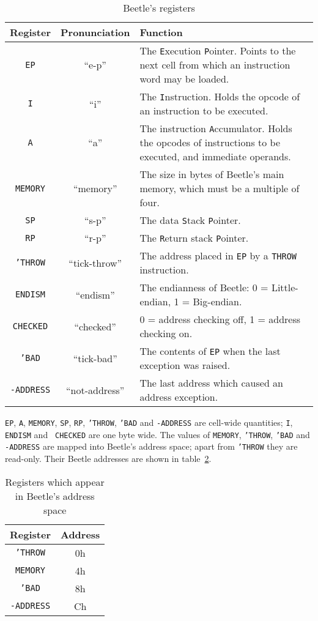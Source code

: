 \documentclass[english]{article}
\newlength{\opcode}\opcode=0.5in
\begin{document}
\begin{table}[htbp]
\begin{center}
\begin{tabular}{ccp{3.75in}} \toprule
\bf Register & \bf Pronunciation & \bf Function \\
    \midrule
{\tt EP} & ``e-p'' & The {\tt E}xecution {\tt P}ointer. Points to the next
    cell from which an instruction word may be loaded. \\
{\tt I} & ``i'' & The {\tt I}nstruction. Holds the opcode of an instruction
    to be executed. \\
{\tt A} & ``a'' & The instruction {\tt A}ccumulator. Holds the opcodes of
    instructions to be executed, and immediate operands. \\
{\tt MEMORY} & ``memory'' & The size in bytes of Beetle's main memory,
    which must be a multiple of four. \\
{\tt SP} & ``s-p'' & The data {\tt S}tack {\tt P}ointer. \\
{\tt RP} & ``r-p'' & The {\tt R}eturn stack {\tt P}ointer. \\
{\tt 'THROW} & ``tick-throw'' & The address placed in {\tt EP} by a {\tt THROW}
    instruction. \\
{\tt ENDISM} & ``endism'' & The endianness of Beetle: 0 = Little-endian,
    1 = Big-endian. \\
{\tt CHECKED} & ``checked'' & 0 = address checking off, 1 = address checking
    on. \\
{\tt 'BAD} & ``tick-bad'' & The contents of {\tt EP} when the last exception
    was raised. \\
{\tt -ADDRESS} & ``not-address'' & The last address which caused an address
    exception. \\ \bottomrule
\end{tabular}
\caption{\label{regtable}Beetle's registers}
\end{center}
\end{table}

{\tt EP}, {\tt A}, {\tt MEMORY}, {\tt SP}, {\tt RP}, {\tt 'THROW}, {\tt 'BAD}
and {\tt -ADDRESS} are cell-wide quantities; {\tt I}, {\tt ENDISM} and {\tt
CHECKED} are one byte wide. The
values of {\tt MEMORY}, {\tt 'THROW}, {\tt 'BAD} and {\tt -ADDRESS} are mapped into Beetle's address space; apart from {\tt 'THROW} they are read-only.
Their Beetle addresses are shown in table~\ref{mappedtable}.

\begin{table}[htbp]
\begin{center}
\begin{tabular}{cc} \toprule
\bf Register & \bf Address \\ \midrule
{\tt 'THROW} & 0h \\
{\tt MEMORY} & 4h \\
{\tt 'BAD} & 8h \\
{\tt -ADDRESS} & Ch \\ \bottomrule
\end{tabular}
\caption{\label{mappedtable}Registers which appear in Beetle's address space}
\end{center}
\end{table}
\end{document}
